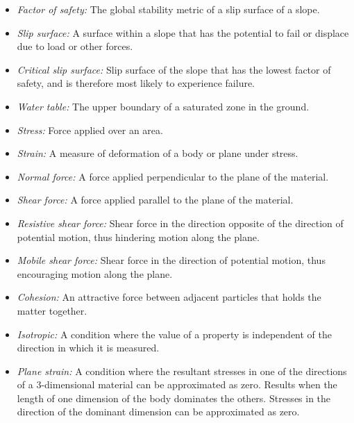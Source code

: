 \documentclass[12pt]{article}
\begin{document}
\begin{itemize}
\item {\textit{Factor of safety:} The global stability metric of a slip surface 
of a slope.}
  
\item {\textit{Slip surface:} A surface within a slope that has the potential 
to fail or displace due to load or other forces.}

\item {\textit{Critical slip surface:} Slip surface of the slope that
  has the lowest factor of safety, and is therefore most likely to
  experience failure.}

\item {\textit{Water table:} The upper boundary of a saturated zone in the 
ground.}

\item {\textit{Stress:} Force applied over an area.}
  
\item {\textit{Strain:} A measure of deformation of a body or plane under 
stress.}
  
\item {\textit{Normal force:} A force applied perpendicular to the
  plane of the material.}
  
\item {\textit{Shear force:} A force applied parallel to the plane of
  the material.}

\item {\textit{Resistive shear force:} Shear force in the direction opposite of 
the direction of potential motion, thus hindering motion along the plane.}
	
\item {\textit{Mobile shear force:} Shear force in the direction of potential 
motion, thus encouraging motion along the plane.}
	
\item {\textit{Cohesion:} An attractive force between adjacent particles that 
holds the matter together.}
  
\item {\textit{Isotropic:} A condition where the value of a property is 
independent of the direction in which it is measured.}
  
\item {\textit{Plane strain:} A condition where the resultant stresses in one 
of the directions of a 3-dimensional material can be approximated as
  zero. Results when the length of one dimension of the body dominates
  the others. Stresses in the direction of the dominant dimension can be 
  approximated as zero.}

\end{itemize}
\end{document}
